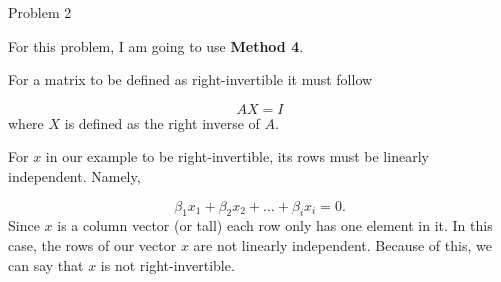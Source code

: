 \begin{problem}{Problem 2}
    \begin{highlight}
        \noindent For this problem, I am going to use \textbf{Method 4}. \vspace*{1em}

        For a matrix to be defined as right-invertible it must follow

        \begin{equation}
            AX = I
        \end{equation}
        where $X$ is defined as the right inverse of $A$.

        For $x$ in our example to be right-invertible, its rows must be linearly independent. Namely,

        \begin{equation}
            \beta_{1}x_{1} + \beta_{2}x_{2} + \dots + \beta_{i}x_{i} = 0.
        \end{equation}
        Since $x$ is a column vector (or tall) each row only has one element in it. In this case, the rows of our vector $x$ are not linearly independent. Because of this, we can say that $x$ is not 
        right-invertible.
    \end{highlight}
\end{problem}

